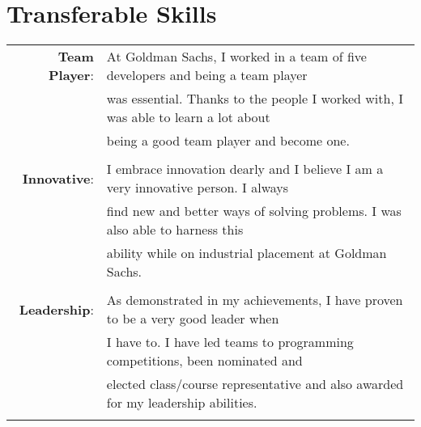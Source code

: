 \documentclass[a4paper,10pt]{article}
\begin{document}
\section{Transferable Skills}
\begin{tabular}{rl}
  \textbf{Team Player}: & At Goldman Sachs, I worked in a team of five developers and being a team
  player\\& was essential. Thanks to the people I worked with, I was able to learn a lot about\\&
  being a good team player and become one.\\\\

  \textbf{Innovative}: & I embrace innovation dearly and I believe I am a very innovative person. I
  always\\& find new and better ways of solving problems. I was also able to harness this\\& ability
  while on industrial placement at Goldman Sachs. \\\\

  \textbf{Leadership}: & As demonstrated in my achievements, I have proven to be a very good leader
  when\\& I have to. I have led teams to programming competitions, been nominated and\\& elected
  class/course representative and also awarded for my leadership abilities.\\\\
\end{tabular}

\end{document}
